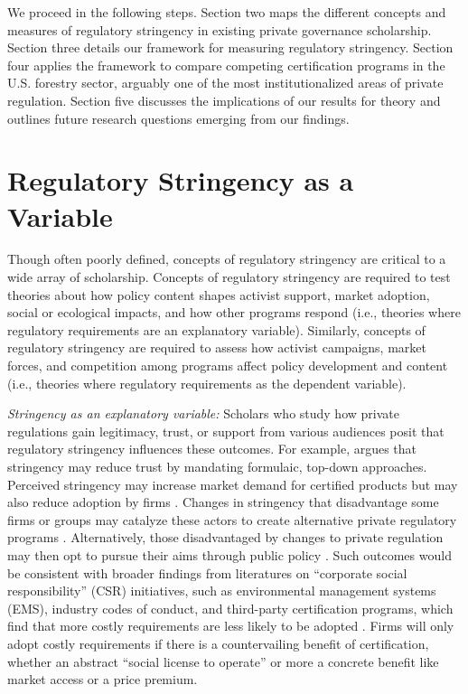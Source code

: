 \documentclass[
      12pt,
            Review ]{article}
\begin{document}
We proceed in the following steps. Section two maps the different concepts and measures of regulatory stringency in existing private governance scholarship. Section three details our framework for measuring regulatory stringency. Section four applies the framework to compare competing certification programs in the U.S. forestry sector, arguably one of the most institutionalized areas of private regulation. Section five discusses the implications of our results for theory and outlines future research questions emerging from our findings.

\hypertarget{regulatory-stringency-as-a-variable}{%
\section{Regulatory Stringency as a Variable}\label{regulatory-stringency-as-a-variable}}

Though often poorly defined, concepts of regulatory stringency are critical to a wide array of scholarship. Concepts of regulatory stringency are required to test theories about how policy content shapes activist support, market adoption, social or ecological impacts, and how other programs respond (i.e., theories where regulatory requirements are an explanatory variable). Similarly, concepts of regulatory stringency are required to assess how activist campaigns, market forces, and competition among programs affect policy development and content (i.e., theories where regulatory requirements as the dependent variable).

\emph{Stringency as an explanatory variable:} Scholars who study how private regulations gain legitimacy, trust, or support from various audiences posit that regulatory stringency influences these outcomes. For example, \citet{McDermott2012} argues that stringency may reduce trust by mandating formulaic, top-down approaches. Perceived stringency may increase market demand for certified products \citep{Atkinson2014} but may also reduce adoption by firms \citep{Prado2013}. Changes in stringency that disadvantage some firms or groups may catalyze these actors to create alternative private regulatory programs \citep{Meidinger2003}. Alternatively, those disadvantaged by changes to private regulation may then opt to pursue their aims through public policy \citep{Weimer2006}. Such outcomes would be consistent with broader findings from literatures on ``corporate social responsibility'' (CSR) initiatives, such as environmental management systems (EMS), industry codes of conduct, and third-party certification programs, which find that more costly requirements are less likely to be adopted \citep{Delmas2008, Kollman2001, Lyon2008}. Firms will only adopt costly requirements if there is a countervailing benefit of certification, whether an abstract ``social license to operate'' or more a concrete benefit like market access or a price premium.
\end{document}
